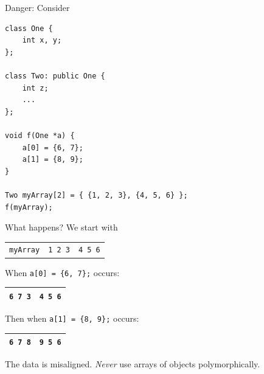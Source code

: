 \documentclass[11pt]{article}
\theoremstyle{definition}
\begin{document}
Danger: Consider
\begin{lstlisting}
class One {
    int x, y;
};

class Two: public One {
    int z;
    ...
};

void f(One *a) {
    a[0] = {6, 7};
    a[1] = {8, 9};
}

Two myArray[2] = { {1, 2, 3}, {4, 5, 6} };
f(myArray);
\end{lstlisting}
\vspace{-0.25cm}
What happens? We start with
\begin{table}[h]
\centering
\begin{tabular}{l|l|l|}
\cline{2-3}
{\tt myArray} & {\tt 1 2 3} & {\tt 4 5 6} \\ \cline{2-3} 
\end{tabular}
\end{table}
\vspace{-0.25cm}

When {\tt a[0] = \{6, 7\};} occurs:
\begin{table}[h]
\centering
\begin{tabular}{|l|l|}
\hline
{\tt 6 7 3} & {\tt 4 5 6} \\ \hline
\end{tabular}
\end{table}
\vspace{-0.25cm}

Then when {\tt a[1] = \{8, 9\};} occurs:
\begin{table}[h]
\centering
\begin{tabular}{|l|l|}
\hline
{\tt 6 7 8} & {\tt 9 5 6} \\ \hline
\end{tabular}
\end{table}
\vspace{-0.25cm}

The data is misaligned. {\it Never} use arrays of objects polymorphically.
\end{document}
